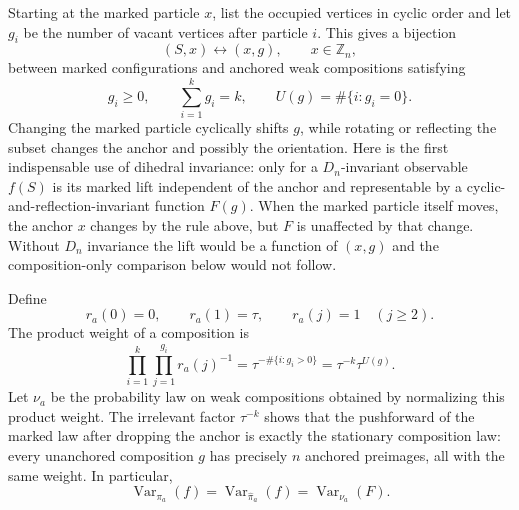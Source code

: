 Starting at the marked particle $x$, list the occupied vertices in cyclic
order and let $g_i$ be the number of vacant vertices after particle $i$.
This gives a bijection
\begin{equation}
 (S,x)\longleftrightarrow(x,g),
 \qquad x\in\mathbb Z_n,
 \end{equation}
between marked configurations and anchored weak compositions satisfying
\begin{equation}
 g_i\geq0,\qquad \sum_{i=1}^kg_i=k,
 \qquad U(g)=\#\{i:g_i=0\}.
 \label{eq:app-gap-composition}
\end{equation}
Changing the marked particle cyclically shifts $g$, while rotating or
reflecting the subset changes the anchor and possibly the orientation.
Here is the first indispensable use of dihedral invariance: only for a
$D_n$-invariant observable $f(S)$ is its marked lift independent of the
anchor and representable by a cyclic-and-reflection-invariant function
$F(g)$.  When the marked particle itself moves, the anchor $x$ changes by
the rule above, but $F$ is unaffected by that change.  Without $D_n$
invariance the lift would be a function of $(x,g)$ and the
composition-only comparison below would not follow.

Define
\begin{equation}
 r_a(0)=0,\qquad r_a(1)=\tau,\qquad r_a(j)=1\quad(j\geq2).
 \label{eq:app-zrp-rates}
\end{equation}
The product weight of a composition is
\begin{equation}
 \prod_{i=1}^k\prod_{j=1}^{g_i}r_a(j)^{-1}
 =\tau^{-\#\{i:g_i>0\}}
 =\tau^{-k}\tau^{U(g)}.
 \label{eq:app-zrp-weight}
\end{equation}
Let $\nu_a$ be the probability law on weak compositions obtained by
normalizing this product weight.  The irrelevant factor $\tau^{-k}$ shows
that the pushforward of the marked
law after dropping the anchor is exactly the stationary composition law:
every unanchored composition $g$ has precisely $n$ anchored preimages, all
with the same weight.  In particular,
\begin{equation}
 \operatorname{Var}_{\pi_a}(f)
 =\operatorname{Var}_{\widehat\pi_a}(f)
 =\operatorname{Var}_{\nu_a}(F).
 \label{eq:app-variance-isometry}
\end{equation}

